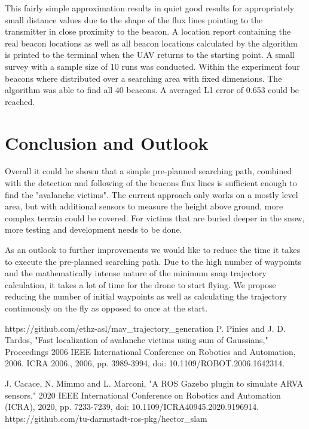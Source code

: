 \documentclass[conference]{IEEEtran}
\begin{document}
This fairly simple approximation results in quiet good results for appropriately small distance values due to the shape of the flux lines pointing to the transmitter in close proximity to the beacon. A location report containing the real beacon locations as well as all beacon locations calculated by the algorithm is printed to the terminal when the UAV returns to the starting point. A small survey with a sample size of 10 runs was conducted. Within the experiment four beacons where distributed over a searching area with fixed dimensions. The algorithm was able to find all 40 beacons. A averaged L1 error of 0.653 could be reached.

\section{Conclusion and Outlook}
Overall it could be shown that a simple pre-planned searching path, combined with the detection and following of the beacons flux lines is sufficient enough to find the "avalanche victims". The current approach only works on a mostly level area, but with additional sensors to measure the height above ground, more complex terrain could be covered. For victims that are buried deeper in the snow, more testing and development needs to be done.

As an outlook to further improvements we would like to reduce the time it takes to execute the pre-planned searching path. Due to the high number of waypoints and the mathematically intense nature of the minimum snap trajectory calculation, it takes a lot of time for the drone to start flying. We propose reducing the number of initial waypoints as well as calculating the trajectory continuously on the fly as opposed to once at the start.



\begin{thebibliography}{00}
 https://github.com/ethz-asl/mav\_trajectory\_generation
 P. Pinies and J. D. Tardos, "Fast localization of avalanche victims using sum of Gaussians," Proceedings 2006 IEEE International Conference on Robotics and Automation, 2006. ICRA 2006., 2006, pp. 3989-3994, doi: 10.1109/ROBOT.2006.1642314.

 J. Cacace, N. Mimmo and L. Marconi, "A ROS Gazebo plugin to simulate ARVA sensors," 2020 IEEE International Conference on Robotics and Automation (ICRA), 2020, pp. 7233-7239, doi: 10.1109/ICRA40945.2020.9196914.
 https://github.com/tu-darmstadt-ros-pkg/hector\_slam

\end{thebibliography}
\end{document}
